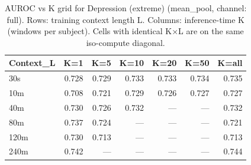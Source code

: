 \begin{table}[ht]
\centering
\caption{AUROC vs K grid for Depression (extreme) (mean_pool, channel: full). Rows: training context length L. Columns: inference-time K (windows per subject). Cells with identical K×L are on the same iso-compute diagonal.}
\label{tab:kgrid_depression_extreme_binary_mean_pool_full}
\begin{tabular}{lrrrrrr}
\toprule
Context_L & K=1 & K=5 & K=10 & K=20 & K=50 & K=all \\
\midrule
30s & 0.728 & 0.729 & 0.733 & 0.733 & 0.734 & 0.735 \\
10m & 0.708 & 0.721 & 0.729 & 0.726 & 0.727 & 0.727 \\
40m & 0.730 & 0.726 & 0.732 & — & — & 0.732 \\
80m & 0.737 & 0.724 & — & — & — & 0.721 \\
120m & 0.730 & 0.713 & — & — & — & 0.713 \\
240m & 0.742 & — & — & — & — & 0.744 \\
\bottomrule
\end{tabular}
\end{table}